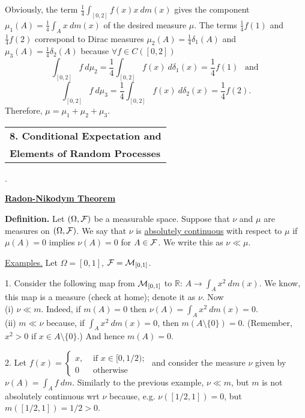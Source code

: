 \documentclass[a4paper,10pt]{article}
\def\RR{\mathbb{R}}
\newcommand{\1}[1]{\mathbf{1}_{\{#1\}}}
\begin{document}
Obviously, the term $\frac{1}{4}\int_{[0,2]} f(x)x~dm(x)$ gives the component $\mu_1(A)=\frac{1}{4}\int_{A} x~dm(x)$ of the desired measure $\mu$. The terms $\frac{1}{4}f(1)$ and $\frac{1}{4}f(2)$ correspond to Dirac measures $\mu_2(A)=\frac{1}{4}\delta_1(A)$ and $\mu_3(A)=\frac{1}{4}\delta_2(A)$ because $\forall f\in C([0,2])$
  $$\int_{[0,2]} f~d\mu_2=\frac{1}{4}\int_{[0,2]} f(x)~d\delta_1(x)=\frac{1}{4} f(1)~~\mbox{ and }$$
  $$\int_{[0,2]} f~d\mu_3=\frac{1}{4}\int_{[0,2]} f(x)~d\delta_2(x)=\frac{1}{4} f(2).$$
Therefore, $\mu=\mu_1+\mu_2+\mu_3$.
\vspace{5mm}

\begin{tabular}{|l|}
\hline {\LARGE\bf 8. Conditional Expectation and}  \\ {\LARGE\bf Elements of Random Processes}\\
\hline\end{tabular}.\vspace{5mm}

\begin{center}\bf\underline{Radon-Nikodym Theorem} \end{center}\vspace{3mm}

{\bf Definition.} Let $(\Omega,{\cal F})$ be a measurable space. Suppose that $\nu$ and $\mu$ are measures on $(\Omega,{\cal F})$. We say that $\nu$ is \underline{absolutely continuous} with respect to $\mu$ if $\mu(A)=0$ implies $\nu(A)=0$ for $A\in{\cal F}$. We write this as $\nu\ll \mu$. \vspace{3mm}

\underline{Examples.} Let $\Omega=[0,1]$, ${\cal F}={\cal M}_{[0,1]}$.

1. Consider the following map from ${\cal M}_{[0,1]}$ to $\RR$: $A\to\int_A x^2~ dm(x)$. We know, this map is a measure (check at home); denote it as $\nu$. Now \\
(i) $\nu\ll m$. Indeed, if $m(A)=0$ then $\nu(A)=\int_A x^2~ dm(x)=0$.\\
(ii) $m\ll\nu$ because, if $\int_A x^2~dm(x)=0$, then $m(A\setminus\{0\})=0$. (Remember, $x^2>0$ if $x\in A\setminus\{0\}$.) And hence $m(A)=0$.

2. Let $f(x)=\left\{\begin{array}{rl} x, & \mbox{ if } x\in[0,1/2); \\ 0 & \mbox{ otherwise} \end{array}\right.$ and consider the measure $\nu$ given by $\nu(A)=\int_A f~dm$. Similarly to the previous example, $\nu\ll m$, but $m$ is not absolutely continuous wrt $\nu$ because, e.g. $\nu([1/2,1])=0$, but $m([1/2,1])=1/2>0$.
\end{document}

